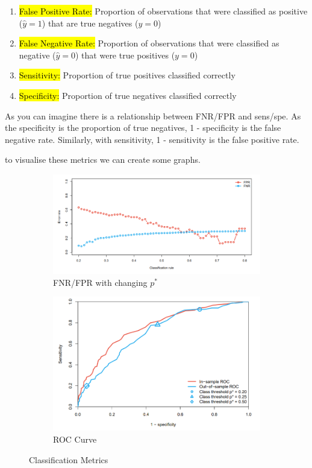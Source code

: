 \documentclass[11pt]{article}
\begin{document}
\begin{enumerate}
    \item \hl{False Positive Rate:} Proportion of observations that were classified as positive ($\hat{y} = 1$) that are true negatives ($y = 0$)
    \item \hl{False Negative Rate:} Proportion of observations that were classified as negative ($\hat{y} = 0$) that were true positives ($y=0$)
    \item \hl{Sensitivity:} Proportion of true positives classified correctly
    \item  \hl{Specificity:} Proportion of true negatives classified correctly
\end{enumerate}

As you can imagine there is a relationship between FNR/FPR and sens/spe. As the specificity is the proportion of true negatives, 1 - specificity is the false negative rate. Similarly, with sensitivity, 1 - sensitivity is the false positive rate.

to visualise these metrics we can create some graphs.


\begin{figure}[h]
\centering
\begin{subfigure}{.5\textwidth}
  \centering
  \includegraphics[width=\linewidth]{pic/error rates.png}
  \caption{FNR/FPR with changing $p^*$}
  \label{fig:classification error rates}
\end{subfigure}%
\begin{subfigure}{.5\textwidth}
  \centering
  \includegraphics[width=\linewidth]{pic/roc.png}
  \caption{ROC Curve}
  \label{fig:ROC curve}
\end{subfigure}
\caption{Classification Metrics}
\label{fig:classification metrics}
\end{figure}
\end{document}
